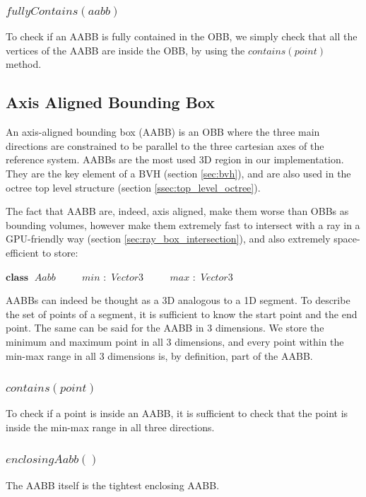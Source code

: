 \documentclass{PoliMi_MasterThesis}
\newcommand*\Class[1]{\State $\textbf{class} \;$ #1}
\newcommand*\Member[2]{\State $\qquad$ #1 $:$ #2}
\begin{document}
\subsubsection*{$fullyContains(aabb)$}
To check if an AABB is fully contained in the OBB, we simply check that all the vertices of the AABB are inside the OBB, by using the $contains(point)$ method.

\subsection{Axis Aligned Bounding Box} \label{ssec:aabb}
An axis-aligned bounding box (AABB) is an OBB where the three main directions are constrained to be parallel to the three cartesian axes of the reference system. AABBs are the most used 3D region in our implementation. They are the key element of a BVH (section \ref{sec:bvh}), and are also used in the octree top level structure (section \ref{ssec:top_level_octree}).

The fact that AABB are, indeed, axis aligned, make them worse than OBBs as bounding volumes, however make them extremely fast to intersect with a ray in a GPU-friendly way (section \ref{sec:ray_box_intersection}), and also extremely space-efficient to store:
\begin{algorithm}[H]
	\begin{algorithmic}
		\Class{$Aabb$}
		\Member{$min$}{$Vector3$}
		\Member{$max$}{$Vector3$}
	\end{algorithmic}
\end{algorithm} 

AABBs can indeed be thought as a 3D analogous to a 1D segment. To describe the set of points of a segment, it is sufficient to know the start point and the end point. The same can be said for the AABB in 3 dimensions. We store the minimum and maximum point in all 3 dimensions, and every point within the min-max range in all 3 dimensions is, by definition, part of the AABB.

\subsubsection*{$contains(point)$}
To check if a point is inside an AABB, it is sufficient to check that the point is inside the min-max range in all three directions.

\subsubsection*{$enclosingAabb()$}
The AABB itself is the tightest enclosing AABB.
\end{document}
